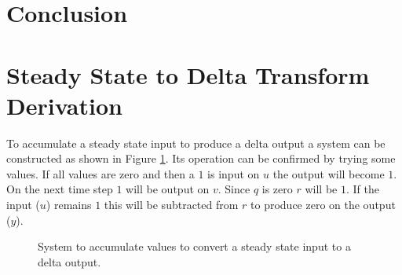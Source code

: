 \documentclass{article}
\begin{document}

\clearpage
\section{Conclusion}

\clearpage
\printbibliography[heading=bibintoc]

\clearpage
\appendix

\clearpage
\section{Steady State to Delta Transform Derivation}
\label{app:cdelta}

To accumulate a steady state input to produce a delta output
a system can be constructed as shown in Figure \ref{fig:cd1}.
Its operation can be confirmed by trying some values.
If all values are zero and then a $1$ is input on $u$ the
output will become $1$.
On the next time step $1$ will be output on $v$.
Since $q$ is zero $r$ will be $1$.
If the input ($u$) remains $1$ this will be subtracted from $r$
to produce zero on the output ($y$).

\begin{figure}[hpb!]
\begin{center}


\end{center}

\caption{System to accumulate values to convert a steady state
input to a delta output.}
\label{fig:cd1}
\end{figure}
\end{document}
